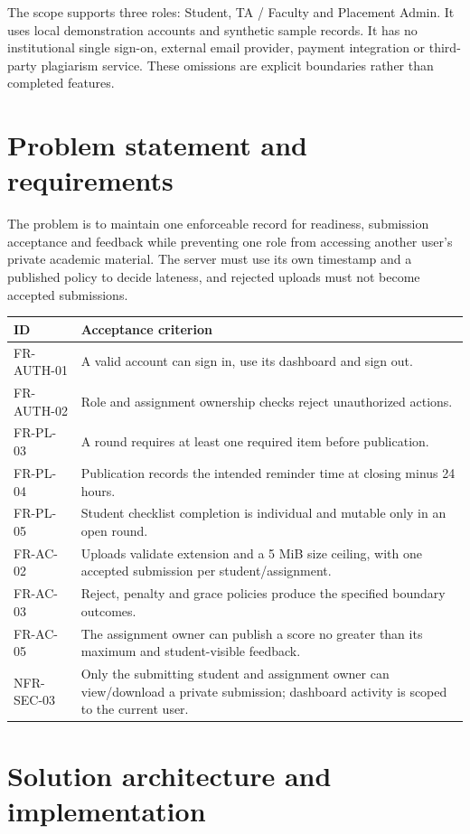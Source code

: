 \documentclass[11pt,a4paper]{article}
\begin{document}
The scope supports three roles: Student, TA / Faculty and Placement Admin. It uses local demonstration accounts and synthetic sample records. It has no institutional single sign-on, external email provider, payment integration or third-party plagiarism service. These omissions are explicit boundaries rather than completed features.

\section{Problem statement and requirements}
The problem is to maintain one enforceable record for readiness, submission acceptance and feedback while preventing one role from accessing another user's private academic material. The server must use its own timestamp and a published policy to decide lateness, and rejected uploads must not become accepted submissions.

\begin{tabularx}{\linewidth}{lX}
\toprule ID & Acceptance criterion \\\midrule
FR-AUTH-01 & A valid account can sign in, use its dashboard and sign out. \\
FR-AUTH-02 & Role and assignment ownership checks reject unauthorized actions. \\
FR-PL-03 & A round requires at least one required item before publication. \\
FR-PL-04 & Publication records the intended reminder time at closing minus 24 hours. \\
FR-PL-05 & Student checklist completion is individual and mutable only in an open round. \\
FR-AC-02 & Uploads validate extension and a 5 MiB size ceiling, with one accepted submission per student/assignment. \\
FR-AC-03 & Reject, penalty and grace policies produce the specified boundary outcomes. \\
FR-AC-05 & The assignment owner can publish a score no greater than its maximum and student-visible feedback. \\
NFR-SEC-03 & Only the submitting student and assignment owner can view/download a private submission; dashboard activity is scoped to the current user. \\
\bottomrule
\end{tabularx}

\section{Solution architecture and implementation}
\end{document}
